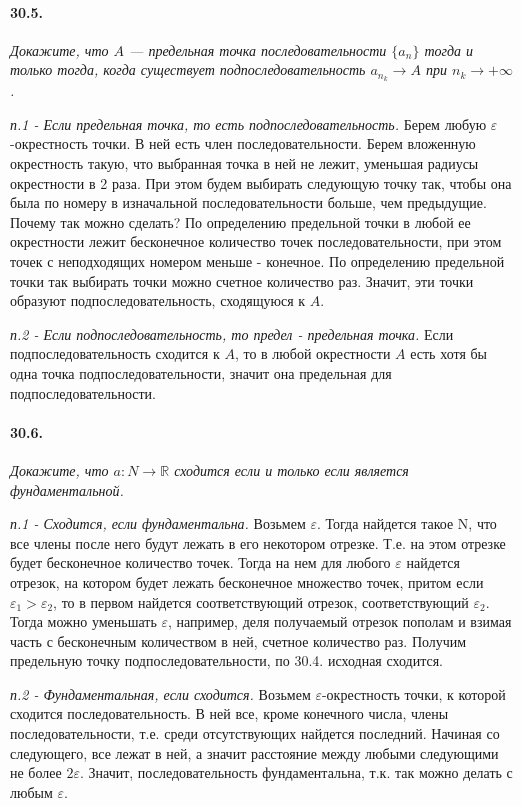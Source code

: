 \documentclass{book}
\begin{document}
\paragraph{30.5.}
\textit{Докажите, что $A$ --- предельная точка последовательности $\{a_n\}$ тогда и только тогда, когда существует подпоследовательность $a_{n_k} \to A$ при $n_k \to +\infty$.}

\textit{п.1 - Если предельная точка, то есть подпоследовательность.}
Берем любую $\varepsilon$-окрестность точки. В ней есть член последовательности. Берем вложенную окрестность такую, что выбранная точка в ней не лежит, уменьшая радиусы окрестности в 2 раза. При этом будем выбирать следующую точку так, чтобы она была по номеру в изначальной последовательности больше, чем предыдущие. Почему так можно сделать? По определению предельной точки в любой ее окрестности лежит бесконечное количество точек последовательности, при этом точек с неподходящих номером меньше - конечное. По определению предельной точки так выбирать точки можно счетное количество раз. Значит, эти точки образуют подпоследовательность, сходящуюся к $A$.

\textit{п.2 - Если подпоследовательность, то предел - предельная точка.}
Если подпоследовательность сходится к $A$, то в любой окрестности $A$ есть хотя бы одна точка подпоследовательности, значит она предельная для подпоследовательности.

\paragraph{30.6.}
\textit{Докажите, что $a: N \to \mathbb{R}$ сходится если и только если является фундаментальной.}

\textit{п.1 - Сходится, если фундаментальна.}
Возьмем $\varepsilon$. Тогда найдется такое N, что все члены после него будут лежать в его некотором отрезке. Т.е. на этом отрезке будет бесконечное количество точек. Тогда на нем для любого $\varepsilon$ найдется отрезок, на котором будет лежать бесконечное множество точек, притом если $\varepsilon_1 > \varepsilon_2$, то в первом найдется соответствующий отрезок, соответствующий $\varepsilon_2$.  Тогда можно уменьшать $\varepsilon$, например, деля получаемый отрезок пополам и взимая часть с бесконечным количеством в ней, счетное количество раз. Получим предельную точку подпоследовательности, по 30.4. исходная сходится.

\textit{п.2 - Фундаментальная, если сходится.}
Возьмем $\varepsilon$-окрестность точки, к которой сходится последовательность. В ней все, кроме конечного числа, члены последовательности, т.е. среди отсутствующих найдется последний. Начиная со следующего, все лежат в ней, а значит расстояние между любыми следующими не более $2\varepsilon$.  Значит, последовательность фундаментальна, т.к. так можно делать с любым $\varepsilon$.
\end{document}
